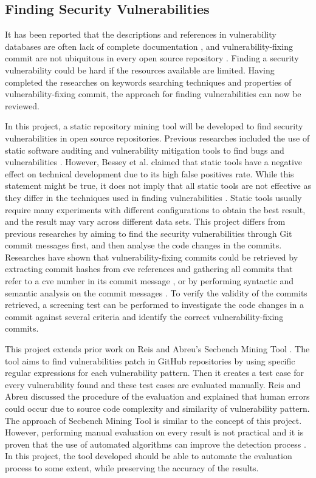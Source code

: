 \documentclass[12pt, a4paper]{report}
\begin{document}
\subsection{Finding Security Vulnerabilities} \label{subsec:finding_vuln}
It has been reported that the descriptions and references in vulnerability databases are often lack
of complete documentation \cite{massacci_2010}, and vulnerability-fixing commit are not ubiquitous
in every open source repository \cite{walden_2014}. Finding a security vulnerability could be hard
if the resources available are limited. Having completed the researches on keywords searching
techniques and properties of vulnerability-fixing commit, the approach for finding vulnerabilities
can now be reviewed.

In this project, a static repository mining tool will be developed to find security vulnerabilities
in open source repositories. Previous researches included the use of static software auditing and
vulnerability mitigation tools to find bugs and vulnerabilities \cite{cowan_2003}. However, Bessey
et al. \cite{bessey_2010} claimed that static tools have a negative effect on technical development
due to its high false positives rate. While this statement might be true, it does not imply that all
static tools are not effective as they differ in the techniques used in finding vulnerabilities
\cite{moser_2008}. Static tools usually require many experiments with different configurations to
obtain the best result, and the result may vary across different data sets. This project differs
from previous researches by aiming to find the security vulnerabilities through Git commit messages
first, and then analyse the code changes in the commits. Researches have shown that
vulnerability-fixing commits could be retrieved by extracting commit hashes from \acrshort{cve}
references and gathering all commits that refer to a \acrshort{cve} number in its commit message
\cite{jimenez_2016}, or by performing syntactic and semantic analysis on the commit messages
\cite{sliwerski_2005}. To verify the validity of the commits retrieved, a screening test
\cite{dashevskyi_2018} can be performed to investigate the code changes in a commit against several
criteria and identify the correct vulnerability-fixing commits.

This project extends prior work on Reis and Abreu's Secbench Mining Tool \cite{secbench}. The tool
aims to find vulnerabilities patch in GitHub repositories by using specific regular expressions for
each vulnerability pattern. Then it creates a test case for every vulnerability found and these test
cases are evaluated manually. Reis and Abreu \cite{reis_2017} discussed the procedure of the
evaluation and explained that human errors could occur due to source code complexity and similarity
of vulnerability pattern. The approach of Secbench Mining Tool is similar to the concept of this
project. However, performing manual evaluation on every result is not practical and it is proven
that the use of automated algorithms can improve the detection process \cite{livshits_2005}. In this
project, the tool developed should be able to automate the evaluation process to some extent, while
preserving the accuracy of the results.
\end{document}
